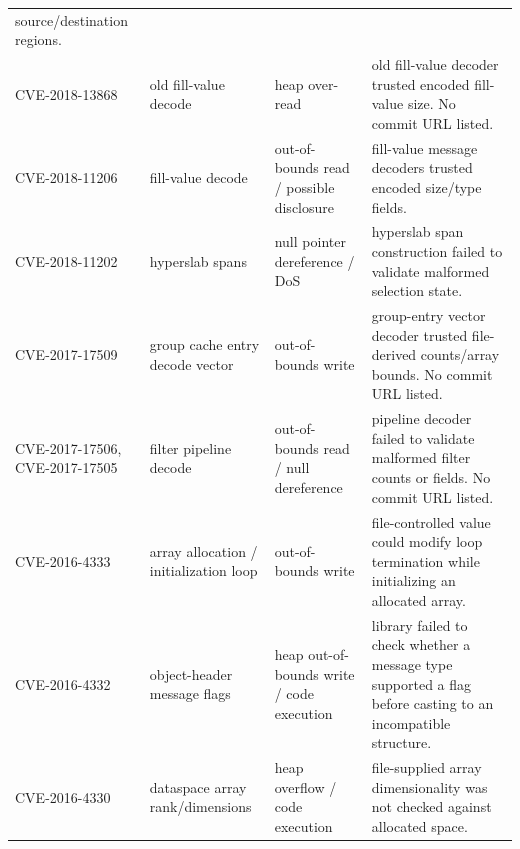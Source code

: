 \documentclass[../main.tex]{subfiles}
\begin{document}
\begin{longtable}{@{}p{0.15\widetablewidth}p{0.20\widetablewidth}p{0.20\widetablewidth}p{0.44\widetablewidth}@{}}
source/destination regions. \\
CVE-2018-13868 &
old fill-value decode &
heap over-read &
old fill-value decoder trusted encoded fill-value size. No commit URL listed. \\
CVE-2018-11206 &
fill-value decode &
out-of-bounds read / possible disclosure &
fill-value message decoders trusted encoded size/type fields. \\
CVE-2018-11202 &
hyperslab spans &
null pointer dereference / DoS &
hyperslab span construction failed to validate malformed selection state. \\
CVE-2017-17509 &
group cache entry decode vector &
out-of-bounds write &
group-entry vector decoder trusted file-derived counts/array bounds. No commit URL
listed. \\
CVE-2017-17506, CVE-2017-17505 &
filter pipeline decode &
out-of-bounds read / null dereference &
pipeline decoder failed to validate malformed filter counts or fields. No commit URL
listed. \\
CVE-2016-4333 &
array allocation / initialization loop &
out-of-bounds write &
file-controlled value could modify loop termination while initializing an allocated
array. \\
CVE-2016-4332 &
object-header message flags &
heap out-of-bounds write / code execution &
library failed to check whether a message type supported a flag before casting to an
incompatible structure. \\
CVE-2016-4330 &
dataspace array rank/dimensions &
heap overflow / code execution &
file-supplied array dimensionality was not checked against allocated space. \\
\end{longtable}
\endgroup
\end{document}

